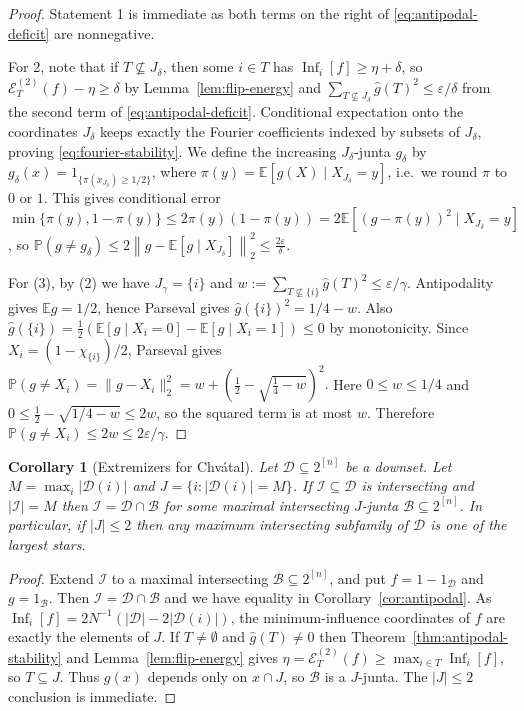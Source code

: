 \documentclass{article}
\theoremstyle{plain}
\newtheorem{cor}[theo]{Corollary}
\theoremstyle{definition}
\newcommand{\mc}[1]{\mathcal{#1}}
\newcommand{\mb}[1]{\mathbb{#1}}
\newcommand{\sub}{\subseteq}
\newcommand{\eps}{\varepsilon}
\newcommand{\es}{\emptyset}
\newcommand{\cE}{\mathcal E}
\newcommand{\on}{\operatorname}
\begin{document}
\begin{proof}
Statement 1 is immediate as both terms on the right of \eqref{eq:antipodal-deficit} are nonnegative. 

For 2, note that if $T\not\sub J_\delta$, then some $i\in T$ has $\on{Inf}_i[f]\ge\eta+\delta$, 
so $\cE_T^{(2)}(f)-\eta\ge\delta$ by Lemma~\ref{lem:flip-energy} and
 $\sum_{T\not\sub J_\delta}\widehat g(T)^2\le\eps/\delta$
 from the second term of \eqref{eq:antipodal-deficit}.
 Conditional expectation onto the coordinates $J_\delta$ keeps exactly the Fourier coefficients 
 indexed by subsets of $J_\delta$, proving \eqref{eq:fourier-stability}.
We define the increasing  $J_\delta$-junta $g_\delta$ by $g_\delta(x)=1_{\{\pi(x_{J_\delta})\ge1/2\}}$,
where $ \pi(y)=\mb E[g(X)\mid X_{J_\delta}=y]$, i.e.~we round $\pi$ to $0$ or $1$.
This gives conditional error $\min\{\pi(y),1-\pi(y)\} \le 2\pi(y)(1-\pi(y)) = 2\mb E[(g-\pi(y))^2\mid X_{J_\delta}=y]$,
so $\mb P(g\ne g_\delta) \le 2\left\|g-\mb E[g\mid X_{J_\delta}]\right\|_2^2 \le\frac{2\eps}{\delta}$.

For (3), by (2) we have $J_\gamma=\{i\}$ and $w:=\sum_{T\not\sub\{i\}}\widehat g(T)^2\le\eps/\gamma$.  
Antipodality gives $\mb Eg=1/2$, hence Parseval gives $\widehat g(\{i\})^2=1/4-w$.  Also
\(\widehat g(\{i\})=\frac12(\mb E[g\mid X_i=0]-\mb E[g\mid X_i=1])\le0\)
by monotonicity.  Since $X_i=(1-\chi_{\{i\}})/2$, Parseval gives
\(
 \mb P(g\ne X_i)=\|g-X_i\|_2^2=w+\left(\frac12-\sqrt{\frac14-w}\right)^2.
\)
Here $0\le w\le1/4$ and $0\le\frac12-\sqrt{1/4-w}\le2w$, so the squared term is at most $w$.  Therefore $\mb P(g\ne X_i)\le2w\le2\eps/\gamma$.
\end{proof}

\begin{cor}[Extremizers for Chv\'atal]\label{cor:chvatal-equality}
Let $\mc D\subseteq2^{[n]}$ be a downset. Let $M=\max_i|\mc D(i)|$ and $J=\{i:|\mc D(i)|=M\}$.  
If $\mc I\sub\mc D$ is intersecting and $|\mc I|=M$ then $\mc I=\mc D\cap\mc B$ 
for some maximal intersecting $J$-junta $\mc B\subseteq2^{[n]}$.
In particular, if $|J| \le 2$ then any maximum intersecting subfamily of $\mc D$
is one of the largest stars.
\end{cor}

\begin{proof}
Extend $\mc I$ to a maximal intersecting $\mc B\subseteq2^{[n]}$, and put $f=1-1_{\mc D}$ and $g=1_{\mc B}$.  
Then $\mc I=\mc D\cap\mc B$ and we have equality in Corollary~\ref{cor:antipodal}.
As $\on{Inf}_i[f]=2N^{-1}(|\mc D|-2|\mc D(i)|)$, the minimum-influence coordinates of $f$ are exactly the elements of $J$.
If $T\ne\es$ and $\widehat g(T)\ne0$ then Theorem~\ref{thm:antipodal-stability} and Lemma~\ref{lem:flip-energy} 
gives $\eta=\cE_T^{(2)}(f)\ge\max_{i\in T}\on{Inf}_i[f]$, so $T\sub J$.  Thus $g(x)$ depends only on $x\cap J$,
so $\mc B$ is a $J$-junta. The $|J| \le 2$ conclusion is immediate.
\end{proof}
\end{document}
